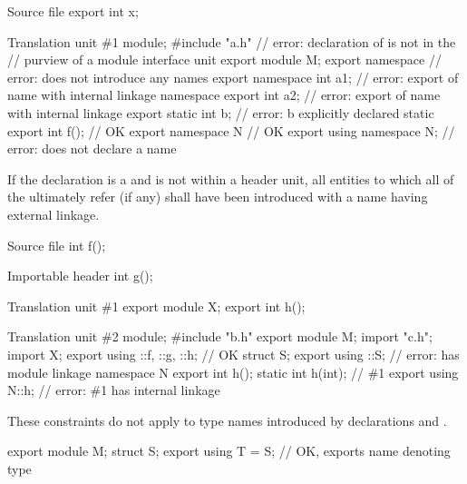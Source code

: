 \pnum
\begin{example}
\begin{codeblocktu}{Source file }
export int x;
\end{codeblocktu}

\begin{codeblocktu}{Translation unit \#1}
module;
#include "a.h"                  // error: declaration of  is not in the
                                // purview of a module interface unit
export module M;
export namespace {}             // error: does not introduce any names
export namespace {
  int a1;                       // error: export of name with internal linkage
}
namespace {
  export int a2;                // error: export of name with internal linkage
}
export static int b;            // error: b explicitly declared static
export int f();                 // OK
export namespace N { }          // OK
export using namespace N;       // error: does not declare a name
\end{codeblocktu}
\end{example}

\pnum
If the declaration is a 
and is not within a header unit,
all entities to which all of the
 ultimately refer (if any)
shall have been introduced with a name having external linkage.
\begin{example}
\begin{codeblocktu}{Source file }
int f();
\end{codeblocktu}

\begin{codeblocktu}{Importable header }
int g();
\end{codeblocktu}

\begin{codeblocktu}{Translation unit \#1}
export module X;
export int h();
\end{codeblocktu}

\begin{codeblocktu}{Translation unit \#2}
module;
#include "b.h"
export module M;
import "c.h";
import X;
export using ::f, ::g, ::h;     // OK
struct S;
export using ::S;               // error:  has module linkage
namespace N {
  export int h();
  static int h(int);            // \#1
}
export using N::h;              // error: \#1 has internal linkage
\end{codeblocktu}
\end{example}
\begin{note}
These constraints do not apply to
type names introduced by  declarations
and .
\begin{example}
\begin{codeblock}
export module M;
struct S;
export using T = S;             // OK, exports name  denoting type 
\end{codeblock}
\end{example}
\end{note}

